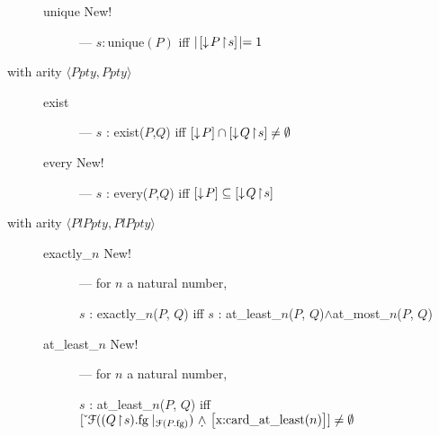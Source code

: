 \begin{description}
\begin{description}
    \item[\textnormal{unique} New!] --- $s:\textrm{unique}(P)$ iff
      $\mid\![\downarrow\!P\!\restriction\!s]\!\mid = 1$

    \end{description}
    

  
\item[with arity \textnormal{$\langle\textit{Ppty},\textit{Ppty}\rangle$}] \mbox{}

  \begin{description}
    
  \item[\textnormal{exist}] ---  $s$ : exist($P$,$Q$) iff
     $[\downarrow\!P]\cap[\downarrow\!Q\!\restriction\! s]\not=\emptyset$
    
  \item[\textnormal{every} New!] --- $s$ : every($P$,$Q$) iff
    $[\downarrow\!P]\subseteq[\downarrow\!Q\!\restriction\!s]$

  \end{description}

  
\item[with arity
  \textnormal{$\langle\textit{PlPpty},\textit{PlPpty}\rangle$}] \mbox{}
  
\begin{description}
    
\item[\textnormal{exactly\_$n$} New!] --- for $n$ a natural number,

  $s$ : exactly\_$n$($P$, $Q$) iff $s$ : at\_least\_$n$($P$, $Q$)$\wedge$at\_most\_$n$($P$, $Q$)


      
    \item[\textnormal{at\_least\_$n$} New!] --- for $n$ a natural
      number,

      $s$ : at\_least\_$n$($P$, $Q$) iff
          $\down{\mathcal{F}((Q\!\restriction\!        s).\text{fg}\mid_{\mathcal{F}(P.\text{fg})})
        \text{ \d{$\wedge$} \smallrecord{\smalltfield{x}{card\_at\_least($n$)}}}}
      \not=\emptyset$



\end{description}
\end{description}
